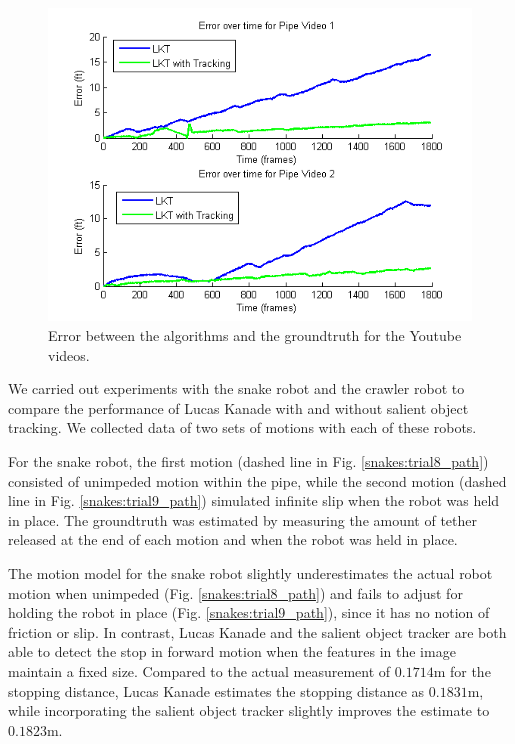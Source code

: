 \documentclass[letterpaper, 10 pt, conference]{ieeeconf}
\begin{document}

\begin{figure}[tb]
	\centering
	\includegraphics[width=\columnwidth]{youtube_err_v_time.png}
	\caption{Error between the algorithms and the groundtruth for the Youtube videos.}
    \label{youtube:error_over_time}
\end{figure}


We carried out experiments with the snake robot and the crawler robot to compare the performance of Lucas Kanade with and without salient object tracking. We collected data of two sets of motions with each of these robots.

For the snake robot, the first motion (dashed line in Fig. \ref{snakes:trial8_path}) consisted of unimpeded motion within the pipe, while the second motion (dashed line in Fig. \ref{snakes:trial9_path}) simulated infinite slip when the robot was held in place. The groundtruth was estimated by measuring the amount of tether released at the end of each motion and when the robot was held in place.

The motion model for the snake robot slightly underestimates the actual robot motion when unimpeded (Fig. \ref{snakes:trial8_path}) and fails to adjust for holding the robot in place (Fig. \ref{snakes:trial9_path}), since it has no notion of friction or slip. In contrast, Lucas Kanade and the salient object tracker are both able to detect the stop in forward motion when the features in the image maintain a fixed size. Compared to the actual measurement of  $0.1714$m for the stopping distance, Lucas Kanade estimates the stopping distance as $0.1831$m, while incorporating the salient object tracker slightly improves the estimate to $0.1823$m. 
\end{document}
